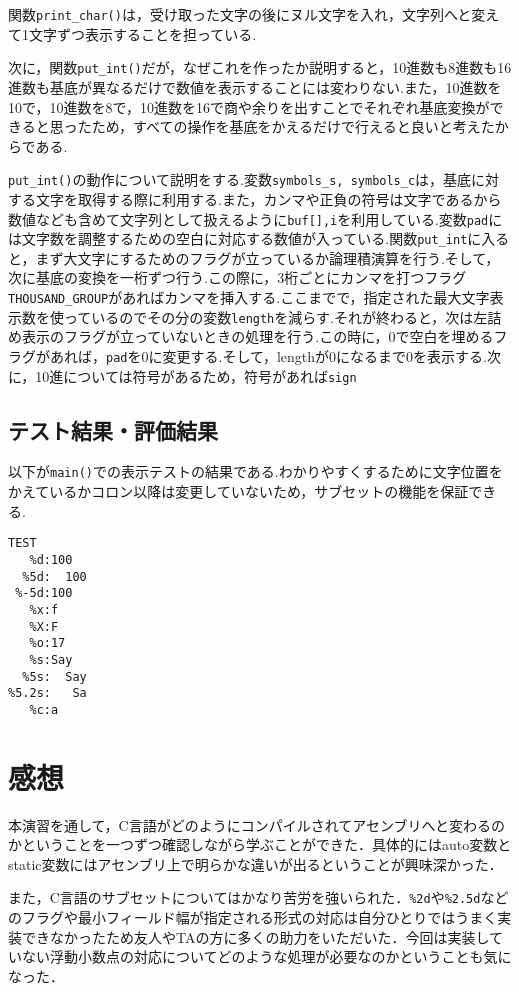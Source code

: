\documentclass[a4j,11pt]{jarticle}
\begin{document}
関数\verb|print_char()|は，受け取った文字の後にヌル文字を入れ，文字列へと変えて1文字ずつ表示することを担っている.

次に，関数\verb|put_int()|だが，なぜこれを作ったか説明すると，10進数も8進数も16進数も基底が異なるだけで数値を表示することには変わりない.また，10進数を10で，10進数を8で，10進数を16で商や余りを出すことでそれぞれ基底変換ができると思ったため，すべての操作を基底をかえるだけで行えると良いと考えたからである.

\verb|put_int()|の動作について説明をする.変数\verb|symbols_s, symbols_c|は，基底に対する文字を取得する際に利用する.また，カンマや正負の符号は文字であるから数値なども含めて文字列として扱えるように\verb|buf[],i|を利用している.変数\verb|pad|には文字数を調整するための空白に対応する数値が入っている.関数\verb|put_int|に入ると，まず大文字にするためのフラグが立っているか論理積演算を行う.そして，次に基底の変換を一桁ずつ行う.この際に，3桁ごとにカンマを打つフラグ\verb|THOUSAND_GROUP|があればカンマを挿入する.ここまでで，指定された最大文字表示数を使っているのでその分の変数\verb|length|を減らす.それが終わると，次は左詰め表示のフラグが立っていないときの処理を行う.この時に，0で空白を埋めるフラグがあれば，\verb|pad|を$0$に変更する.そして，lengthが0になるまで0を表示する.次に，10進については符号があるため，符号があれば\verb|sign|
  \subsection{テスト結果・評価結果}
以下が\verb|main()|での表示テストの結果である.わかりやすくするために文字位置をかえているかコロン以降は変更していないため，サブセットの機能を保証できる.
\begin{verbatim}
TEST
   %d:100
  %5d:  100
 %-5d:100  
   %x:f
   %X:F
   %o:17
   %s:Say
  %5s:  Say
%5.2s:   Sa
   %c:a
\end{verbatim}

\section{感想}
本演習を通して，C言語がどのようにコンパイルされてアセンブリへと変わるのかということを一つずつ確認しながら学ぶことができた．具体的にはauto変数とstatic変数にはアセンブリ上で明らかな違いが出るということが興味深かった．

また，C言語のサブセットについてはかなり苦労を強いられた．\verb|%2d|や\verb|%2.5d|などのフラグや最小フィールド幅が指定される形式の対応は自分ひとりではうまく実装できなかったため友人やTAの方に多くの助力をいただいた．今回は実装していない浮動小数点の対応についてどのような処理が必要なのかということも気になった．
\end{document}
